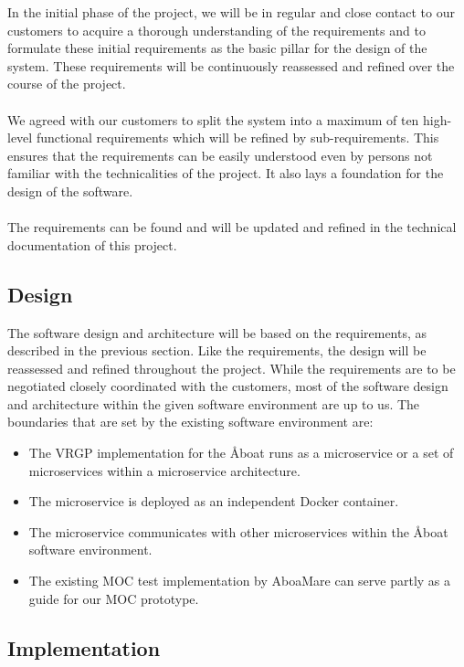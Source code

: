 In the initial phase of the project, we will be in regular and close contact to our customers to acquire a thorough understanding of the requirements and to formulate these initial requirements as the basic pillar for the design of the system. These requirements will be continuously reassessed and refined over the course of the project.
\\\\
We agreed with our customers to split the system into a maximum of ten high-level functional requirements which will be refined by sub-requirements. This ensures that the requirements can be easily understood even by persons not familiar with the technicalities of the project. It also lays a foundation for the design of the software.
\\\\
The requirements can be found and will be updated and refined in the technical documentation of this project.

\subsection{Design}\label{sec:design}

The software design and architecture will be based on the requirements, as described in the previous section. Like the requirements, the design will be reassessed and refined throughout the project. While the requirements are to be negotiated closely coordinated with the customers, most of the software design and architecture within the given software environment are up to us. The boundaries that are set by the existing software environment are:

\begin{itemize}
	\item The VRGP implementation for the Åboat runs as a microservice or a set of microservices within a microservice architecture.
	\item The microservice is deployed as an independent Docker container.
	\item The microservice communicates with other microservices within the Åboat software environment.
	\item The existing MOC test implementation by AboaMare can serve partly as a guide for our MOC prototype.
\end{itemize}

\subsection{Implementation}\label{sec:implementation}

